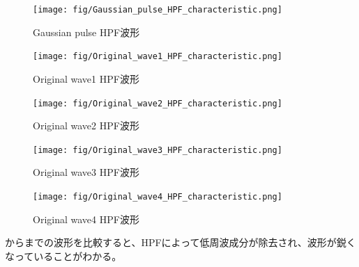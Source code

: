 \documentclass[11pt,dvipdfmx]{jarticle}
\begin{document}
\begin{figure}[H]
  \centering
  \texttt{[image: fig/Gaussian\_pulse\_HPF\_characteristic.png]}
  \caption{Gaussian pulse HPF波形}
  \label{fig:Gaussian_pulse_HPF}
\end{figure}
\begin{figure}[H]
  \centering
  \texttt{[image: fig/Original\_wave1\_HPF\_characteristic.png]}
  \caption{Original wave1 HPF波形}
  \label{fig:Original_wave1_HPF}
\end{figure}
\begin{figure}[H]
  \centering
  \texttt{[image: fig/Original\_wave2\_HPF\_characteristic.png]}
  \caption{Original wave2 HPF波形}
  \label{fig:Original_wave2_HPF}
\end{figure}
\begin{figure}[H]
  \centering
  \texttt{[image: fig/Original\_wave3\_HPF\_characteristic.png]}
  \caption{Original wave3 HPF波形}
  \label{fig:Original_wave3_HPF}
\end{figure}
\begin{figure}[H]
  \centering
  \texttt{[image: fig/Original\_wave4\_HPF\_characteristic.png]}
  \caption{Original wave4 HPF波形}
  \label{fig:Original_wave4_HPF}
\end{figure}
からまでの波形を比較すると、HPFによって低周波成分が除去され、波形が鋭くなっていることがわかる。
\end{document}
